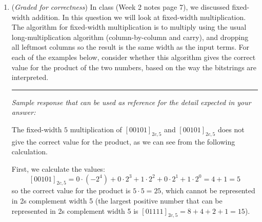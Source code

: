 \begin{enumerate}
\begin{enumerate}
    Pro tip: To show a color, you can use the following LaTeX source code:
    
        \verb|\definecolor{UCSDaccent}{RGB}{0,198,215}|

        \verb|\textcolor{UCSDaccent}{\rule{1cm}{1cm}}|

    which produces 
    \textcolor{UCSDaccent}{\rule{1cm}{1cm}}

    Notice that the code to define the color uses the decimal-like values 
    for each of the red, green, and blue components. For the UCSD accent color we defined, 
    the base $16$ fixed-width $2$ values are: red is $(00)_{16,2}$, green is $(C6)_{16,2}$,
    blue is $(D7)_{16,2}$.

    {\it Extra; not for credit:} What does this mean about the choice of hex color for
    representing colors? What are advantages and disadvantages of this representation?

    \end{enumerate}

    \item ({\it Graded for correctness}) In class (Week 2 notes page 7), we discussed fixed-width addition. In this
    question we will look at fixed-width multiplication. The algorithm for fixed-width 
    multiplication is to multiply using the usual long-multiplication algorithm 
    (column-by-column and carry), and dropping all leftmost columns so the result is the same 
    width as the input terms. For each of the examples below, consider whether 
    this algorithm gives the correct value for the product of the two numbers, based on
    the way the bitstrings are interpreted.

    \rule{0.5\textwidth}{.4pt}

    {\it Sample response that can be used as reference for the detail expected 
    in your answer:} 
    
    The fixed-width $5$ multiplication of $[00101]_{2c,5}$ and $[00101]_{2c,5}$ 
    does not give the correct
    value for the product, as we can see from the following calculation.
    
    First, we calculate the values: 
    \[
        [00101]_{2c,5} = 0\cdot (-2^4) + 0\cdot 2^3 + 1 \cdot 2^2 + 0\cdot 2^1 + 1 \cdot 2^0 = 4 + 1 = 5
    \]
    so the correct value for the product is $5 \cdot 5 = 25$, which cannot be represented
    in 2s complement width 5 (the largest positive number that can be represented in 
    2s complement width 5 is $[01111]_{2c,5} = 8 + 4 + 2 + 1 = 15$).
    

\end{enumerate}
